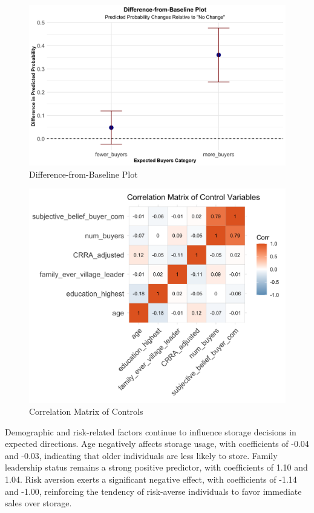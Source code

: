 \documentclass[12pt]{article}
\begin{document}
\begin{figure}[ht]
    \centering
    \includegraphics[width=1\textwidth]{figures/filtered_difference_from_baseline_plot.png}
    \caption{Difference-from-Baseline Plot}
    \label{Figure: Difference-from-Baseline Plot}
\end{figure}

\newpage
\begin{figure}[ht]
\centering
\includegraphics[width=1\textwidth]{figures/correlation_matrix_controls.png}
\caption{Correlation Matrix of Controls}
\label{Figure: Correlation Matrix of Controls}
\end{figure}

Demographic and risk-related factors continue to influence storage decisions in expected directions. Age negatively affects storage usage, with coefficients of -0.04 and -0.03, indicating that older individuals are less likely to store. Family leadership status remains a strong positive predictor, with coefficients of 1.10 and 1.04. Risk aversion exerts a significant negative effect, with coefficients of -1.14 and -1.00, reinforcing the tendency of risk-averse individuals to favor immediate sales over storage.  
\end{document}
